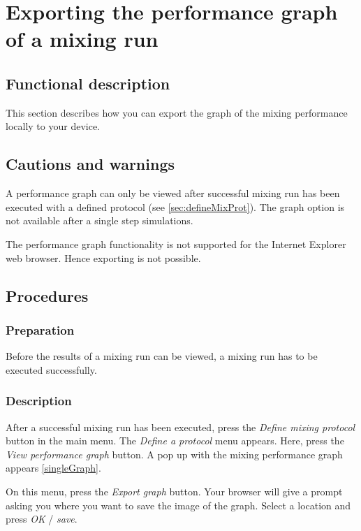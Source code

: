 
\section{Exporting the performance graph of a mixing run}
\label{sec:exportSingleGraph}

\subsection{Functional description}
This section describes how you can export the graph of the mixing performance locally to your device.

\subsection{Cautions and warnings}
A performance graph can only be viewed after successful mixing run has been executed with a defined protocol (see \ref{sec:defineMixProt}). The graph option is not available after a single step simulations.

The performance graph functionality is not supported for the Internet Explorer web browser. Hence exporting is not possible.

\subsection{Procedures}
\subsubsection{Preparation}
Before the results of a mixing run can be viewed, a mixing run has to be executed successfully.

\subsubsection{Description}
After a successful mixing run has been executed, press the \emph{Define mixing protocol} button in the main menu. The \emph{Define a protocol} menu appears. Here, press the \emph{View performance graph} button. A pop up with the mixing performance graph appears \ref{singleGraph}.


On this menu, press the \emph{Export graph} button. Your browser will give a prompt asking you where you want to save the image of the graph. Select a location and press \emph{OK} / \emph{save}.

